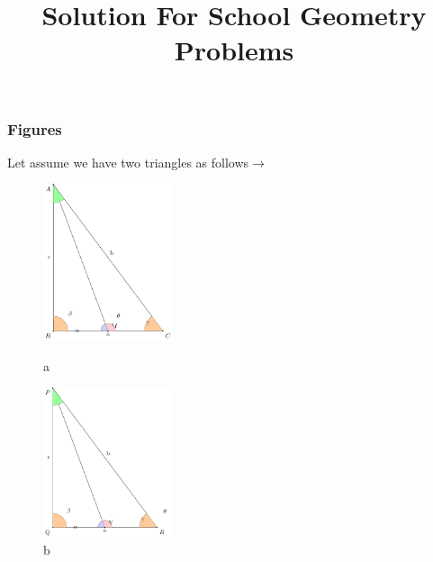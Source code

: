 \documentclass{beamer}
\title{\textbf{Solution For School Geometry Problems}}
\begin{document}
	\frame{
			\titlepage
		  }
	  
	  	
	  	
	    \begin{frame}    	
			\frametitle{Figures}
	    		 Let assume we have two triangles as follows$\to$\\
	    		 
	    	\begin{figure}[!htb]
	    		\begin{minipage}{0.48\textwidth}
	    			\centering
	    			\includegraphics[width=1.5in]{./congurentpicabc.pdf}
	    			\caption{a}
	    			\label{fig:triangle}
	    		\end{minipage}
	    		\hfill
	    		\begin{minipage}{0.48\textwidth}
	    			\centering
	    			\includegraphics[width=1.5in]{./congurentpicabc2.pdf}
	    			\caption{b}
	    			\label{fig:triangle2}
	    		\end{minipage}	
	    	\end{figure}
	    \end{frame}   
        
\end{document}
